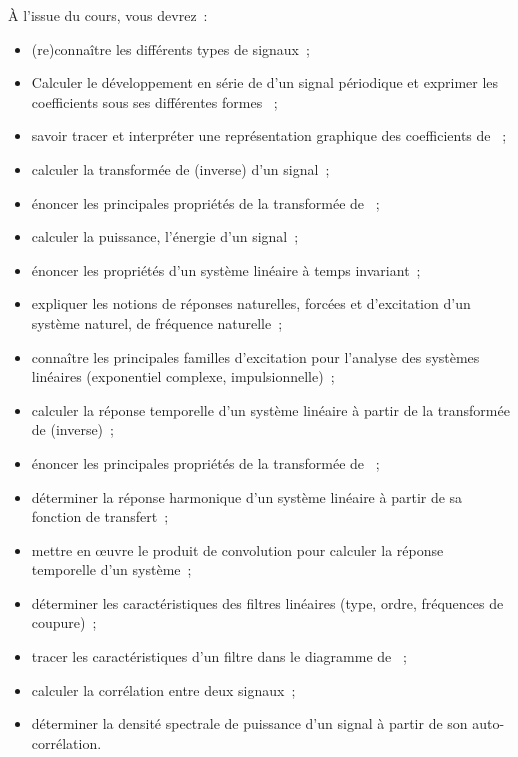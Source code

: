 	À l'issue du cours, vous devrez~: 
	\begin{itemize}
		\item (re)connaître les différents types de signaux~;
		\item Calculer le développement en série de \Fourier{} d'un signal périodique et exprimer les coefficients sous ses différentes formes ~;
		\item savoir tracer et interpréter une représentation graphique des coefficients de \Fourier{}~;
		\item calculer la transformée de \Fourier{} (inverse) d'un signal~;
		\item énoncer les principales propriétés de la transformée de \Fourier{} ~;
		\item calculer la puissance, l'énergie d'un signal~;
		\item énoncer les propriétés d'un système linéaire à temps invariant~;
		\item expliquer les notions de réponses naturelles, forcées et d'excitation d'un système naturel, de fréquence naturelle~;
		\item connaître les principales familles d'excitation pour l'analyse des systèmes linéaires (exponentiel complexe, impulsionnelle)~;
		\item calculer la réponse temporelle d'un système linéaire à partir de la transformée de \Laplace{} (inverse)~;
		\item énoncer les principales propriétés de la transformée de \Laplace{}~;
		\item déterminer la réponse harmonique d'un système linéaire à partir de sa fonction de transfert~;
		\item mettre en œuvre le produit de convolution pour calculer la réponse temporelle d'un système~;
		\item déterminer les caractéristiques des filtres linéaires (type, ordre, fréquences de coupure)~;
		\item tracer les caractéristiques d'un filtre dans le diagramme de \Bode{}~;
		\item calculer la corrélation entre deux signaux~;
		\item déterminer la densité spectrale de puissance d'un signal à partir de son auto-corrélation.
	\end{itemize}
	
	
